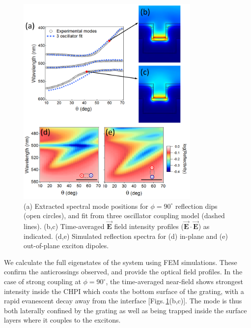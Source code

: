 \begin{figure}[h!] 
\centering    
\includegraphics[width=0.8\textwidth]{Fig18}
\caption{(a) Extracted spectral mode positions for $\phi=90^{\circ}$ reflection dips (open circles), and fit from three oscillator coupling model (dashed lines). (b,c) Time-averaged $\vec{\mathbf{E}}$ field intensity profiles ($\vec{\mathbf{E}}\cdot\vec{\mathbf{E}}$) as indicated. (d,e) Simulated reflection spectra for (d) in-plane and (e) out-of-plane exciton dipoles.}
\label{7Fig18}
\end{figure}
We calculate the full eigenstates of the system using FEM simulations. These confirm the anticrossings observed, and provide the optical field profiles.
In the case of strong coupling at $\phi=90^{\circ}$, the time-averaged near-field shows strongest intensity inside the CHPI which coats the bottom surface of the grating, with a rapid evanescent decay away from the interface [Figs.\,\ref{7Fig18}(b,c)]. The mode is thus both laterally confined by the grating as well as being trapped inside the surface layers where it couples to the excitons.

